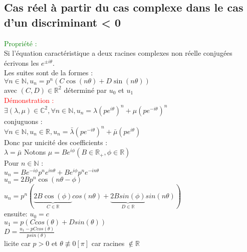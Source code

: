 \documentclass{article}
\begin{document}
\subsection{Cas réel à partir du cas complexe dans le cas d'un discriminant < 0}
\textcolor{green}{Propriété :} \\ 
Si l'équation caractéristique a deux racines complexes non réelle conjugées écrivons les $e^{\pm i \theta}$. \\ 
Les suites sont de la formes : \\ 
$\forall n \in \mathbb{N}, u_n=p^n(C\cos(n\theta)+D\sin(n\theta))$ \\ 
avec $(C,D) \in \mathbb{R}^2$ déterminé par $u_0$ et $u_1$ \\ 
\textcolor{red}{Démonstration :} \\
$\exists(\lambda, \mu) \in \mathbb{C}^2, \forall n \in \mathbb{N}, u_n=\lambda(pe^{i\theta})^n+ \mu (pe^{-i \theta})^n$ \\ 
conjuguons : \\ 
$\forall n \in \mathbb{N}, u_n \in \mathbb{R}, u_n=\bar{\lambda}(pe^{-i \theta})^n+ \bar{\mu}(pe^{i\theta})$ \\ 
Donc par unicité des coefficients : \\
$\lambda=\bar{\mu}$
Notons $ \mu= B e^{i \phi}(B \in \mathbb{R}_+, \phi \in \mathbb{R})$ \\ 
Pour $n \in \mathbb{N}$ : \\ 
$u_n=Be^{-i \phi}p^ne^{in\theta}+B e^{i\phi }p^ne^{-in\theta}$ \\ 
$u_n=2Bp^n\cos(n\theta- \phi)$ \\ 
$u_n=p^n(\underbrace{2B\cos(\phi)}_{C\in \mathbb{R}}cos(n\theta)+\underbrace{2Bsin(\phi)}_{D\in \mathbb{R}}sin(n\theta))$ \\ 
ensuite: $u_0=c$ \\ 
$u_1=p(Ccos(\theta)+Dsin(\theta))$ \\ 
$D=\frac{u_1-pCcos(\theta)}{p sin(\theta)}$ \\ 
licite car $p>0$ et $\theta \not\equiv 0[\pi]$ car racines $\notin \mathbb{R}$ \\ 
\end{document}
